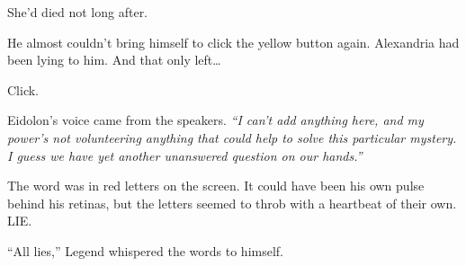 She'd died not long after.



He almost couldn't bring himself to click the yellow button again.  Alexandria had been lying to him.  And that only left\ldots



Click.



Eidolon's voice came from the speakers.  \emph{``I can't add anything here, and my power's not volunteering anything that could help to solve this particular mystery.  I guess we have yet another unanswered question on our hands.''}



The word was in red letters on the screen.  It could have been his own pulse behind his retinas, but the letters seemed to throb with a heartbeat of their own.  LIE.



``All lies,'' Legend whispered the words to himself.





